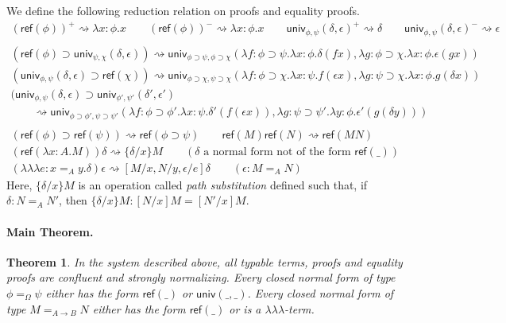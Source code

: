 \documentclass{easychair}
\newcommand{\univ}[4]{\mathsf{univ}_{{#1},{#2}} \left( {#3} , {#4} \right)}
\newcommand{\triplelambda}{\lambda \!\! \lambda \!\! \lambda}
\newcommand{\reff}[1]{\mathsf{ref} \left( {#1} \right)}
\newtheorem{theorem}[lemma]{Theorem}
\begin{document}
We define the following reduction relation on proofs and equality proofs.
\begin{gather*}
(\reff{\phi})^+ \rightsquigarrow \lambda x : \phi . x
\qquad
(\reff{\phi})^- \rightsquigarrow \lambda x : \phi . x
\qquad
\univ{\phi}{\psi}{\delta}{\epsilon}^+ \rightsquigarrow \delta
\qquad
\univ{\phi}{\psi}{\delta}{\epsilon}^- \rightsquigarrow \epsilon
\\ \\
(\reff \phi \supset \univ{\psi}{\chi}{\delta}{\epsilon}) \rightsquigarrow \univ{\phi \supset \psi}{\phi \supset \chi}{\lambda f : \phi \supset \psi . \lambda x : \phi . \delta (f x)}{\lambda g : \phi \supset \chi . \lambda x : \phi . \epsilon (g x)}
\\
(\univ{\phi}{\psi}{\delta}{\epsilon} \supset \reff{\chi}) \rightsquigarrow \univ{\phi \supset \chi}{\psi \supset \chi}{\lambda f : \phi \supset \chi. \lambda x : \psi . f (\epsilon x)}{\lambda g : \psi \supset \chi . \lambda x : \phi . g (\delta x)}
\\
(\univ{\phi}{\psi}{\delta}{\epsilon} \supset \univ{\phi'}{\psi'}{\delta'}{\epsilon'} \hspace{8cm} \\
\qquad \rightsquigarrow \univ{\phi \supset \phi'}{\psi \supset \psi'}
{\lambda f : \phi \supset \phi' . \lambda x : \psi . \delta' (f (\epsilon x))}{\lambda g : \psi \supset \psi' . \lambda y : \phi . \epsilon' (g (\delta y))}
\\ \\
(\reff{\phi} \supset \reff{\psi}) \rightsquigarrow \reff{\phi \supset \psi}
\qquad
\reff{M} \reff{N} \rightsquigarrow \reff{MN}
\\
(\reff{\lambda x:A.M})\delta \rightsquigarrow \{ \delta / x \} M \qquad (\delta \text{ a normal form not of the form } \reff{\_})
\\
(\triplelambda e : x =_A y.\delta)\epsilon \rightsquigarrow [M/x, N/y, \epsilon/e]\delta \qquad (\epsilon : M =_A N)
\end{gather*}
Here, $\{ \delta / x \}M$ is an operation called \emph{path substitution} defined such that, if $\delta : N =_A N'$, then $\{ \delta / x \} M : [N/x]M = [N'/x]M$.

\paragraph{Main Theorem.}

\begin{theorem}
In the system described above, all typable terms, proofs and equality proofs are confluent and strongly normalizing.  Every closed normal form of type $\phi =_\Omega \psi$ either has the form $\reff{\_}$ or $\mathsf{univ}(\_,\_)$.  Every closed normal form of type $M =_{A \rightarrow B} N$ either has the form $\reff{\_}$ or is a $\triplelambda$-term.
\end{theorem}
\end{document}
